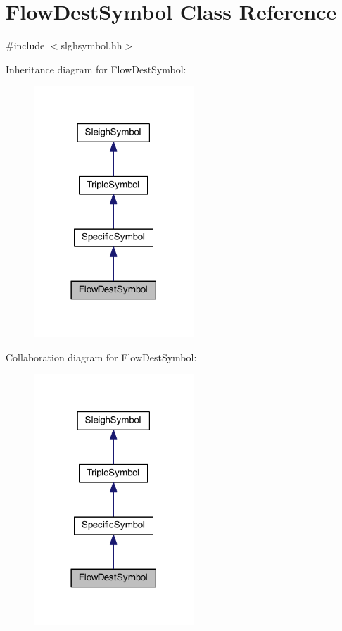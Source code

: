 \hypertarget{class_flow_dest_symbol}{}\section{Flow\+Dest\+Symbol Class Reference}
\label{class_flow_dest_symbol}


{\ttfamily \#include $<$slghsymbol.\+hh$>$}



Inheritance diagram for Flow\+Dest\+Symbol\+:
\nopagebreak
\begin{figure}[H]
\begin{center}
\leavevmode
\includegraphics[width=170pt]{class_flow_dest_symbol__inherit__graph}
\end{center}
\end{figure}


Collaboration diagram for Flow\+Dest\+Symbol\+:
\nopagebreak
\begin{figure}[H]
\begin{center}
\leavevmode
\includegraphics[width=170pt]{class_flow_dest_symbol__coll__graph}
\end{center}
\end{figure}
